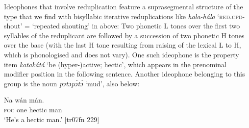 Ideophones that involve reduplication feature a suprasegmental structure of the type that we find with bisyllabic iterative reduplications like \textit{hala-hála} ‘\textsc{red.cpd-}shout’ = ‘repeated shouting’ in  above: Two phonetic L tones over the first two syllables of the reduplicant are followed by a succession of two phonetic H tones over the base (with the last H tone resulting from raising of the lexical L to H, which is phonologised and does not vary). One such ideophone is the property item \textit{katakátá} ‘be (hyper-)active; hectic’, which appears in the prenominal modifier position in the following sentence. Another ideophone belonging to this group is the noun \textit{pɔtɔpɔ́tɔ́} ‘mud’, also below:


\ea%
    \label{ex:key:1616}
    \gll Na  wán      mán.\\
\textsc{foc}  one    hectic    man\\

\glt ‘He’s a hectic man.’ [tr07fn 229]
\z


